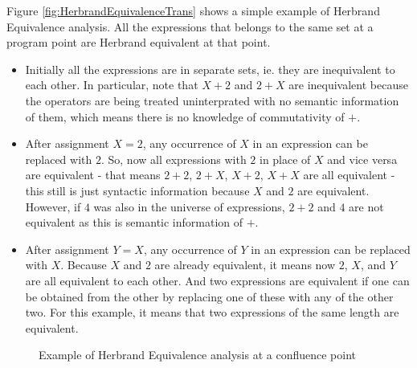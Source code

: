 Figure \ref{fig:HerbrandEquivalenceTrans} shows a simple example of Herbrand Equivalence analysis. All the expressions that belongs to the same set at a program point are Herbrand equivalent at that point.
\begin{itemize}
    \item   Initially all the expressions are in separate sets, ie. 
    they are inequivalent to each other. In particular, note that 
    $X + 2$ and $2 + X$ are inequivalent because the operators are 
    being treated uninterprated with no semantic information of them, 
    which means there is no knowledge of commutativity of $+$.
    \item   After assignment $X = 2$, any occurrence of $X$ in an
    expression can be replaced with $2$. So, now all expressions with 
    $2$ in place of $X$ and vice versa are equivalent - that means
    $2 + 2$, $2 + X$, $X + 2$, $X + X$ are all equivalent - this still 
    is just syntactic information because $X$ and $2$ are equivalent. 
    However, if $4$ was also in the universe of expressions, $2 + 2$ and 
    $4$ are not equivalent as this is semantic information of $+$.
    \item   After assignment $Y = X$, any occurrence of $Y$ in 
    an expression can be replaced with $X$. Because $X$ and $2$ are already 
    equivalent, it means now $2$, $X$, and $Y$ are all equivalent to 
    each other. And two expressions are equivalent if one can be 
    obtained from the other by replacing one of these with any of the 
    other two. For this example, it means that two expressions of 
    the same length are equivalent.
\end{itemize}

\begin{figure}[!ht]
\label{fig:HerbrandEquivalenceConv}
    \caption{Example of Herbrand Equivalence analysis at a confluence point}
\end{figure}


